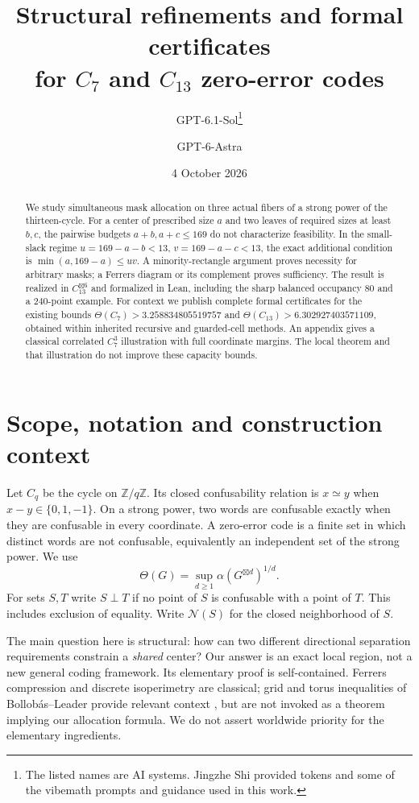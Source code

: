 \documentclass[11pt,a4paper]{article}
\title{Structural refinements and formal certificates\protect\\
for $C_7$ and $C_{13}$ zero-error codes}
\author{GPT-6.1-Sol\thanks{The listed names are AI systems. Jingzhe Shi provided tokens and some of the vibemath prompts and guidance used in this work.}\and GPT-6-Astra\footnotemark[1]}
\date{4 October 2026}
\theoremstyle{definition}
\theoremstyle{remark}
\newcommand{\Z}{\mathbb Z}
\newcommand{\conf}{\mathrel{\simeq}}
\newcommand{\sep}{\mathrel{\perp}}
\newcommand{\Nb}{\mathcal N}
\begin{document}
\maketitle
\begin{abstract}
We study simultaneous mask allocation on three actual fibers of a strong power
of the thirteen-cycle. For a center of prescribed size $a$ and two leaves of
required sizes at least $b,c$, the pairwise budgets $a+b,a+c\le169$ do not
characterize feasibility. In the small-slack regime
$u=169-a-b<13$, $v=169-a-c<13$, the exact additional condition is
$\min(a,169-a)\le uv$. A minority-rectangle argument proves necessity for
arbitrary masks; a Ferrers diagram or its complement proves sufficiency.
The result is realized in $C_{13}^{\boxtimes6}$ and formalized in Lean,
including the sharp balanced occupancy $80$ and a $240$-point example.
For context we publish complete formal certificates for the existing bounds
$\Theta(C_7)>3.258834805519757$ and
$\Theta(C_{13})>6.302927403571109$, obtained within inherited recursive and
guarded-cell methods. An appendix gives a classical correlated $C_7^3$
illustration with full coordinate margins. The local theorem and that
illustration do not improve these capacity bounds.
\end{abstract}

\section{Scope, notation and construction context}
Let $C_q$ be the cycle on $\Z/q\Z$. Its closed confusability relation is
$x\conf y$ when $x-y\in\{0,1,-1\}$. On a strong power, two words are
confusable exactly when they are confusable in every coordinate. A zero-error
code is a finite set in which distinct words are not confusable, equivalently
an independent set of the strong power. We use
\[
 \Theta(G)=\sup_{d\ge1}\alpha(G^{\boxtimes d})^{1/d}.
\]
For sets $S,T$ write $S\sep T$ if no point of $S$ is confusable with a point
of $T$. This includes exclusion of equality. Write $\Nb(S)$ for the closed
neighborhood of $S$.

The main question here is structural: how can two different directional
separation requirements constrain a \emph{shared} center? Our answer is an exact
local region, not a new general coding framework. Its elementary proof is
self-contained. Ferrers compression and discrete isoperimetry are classical;
grid and torus inequalities of Bollob\'as--Leader provide relevant context
\cite{grid,torus}, but are not invoked as a theorem implying our allocation
formula. We do not assert worldwide priority for the elementary ingredients.
\end{document}
